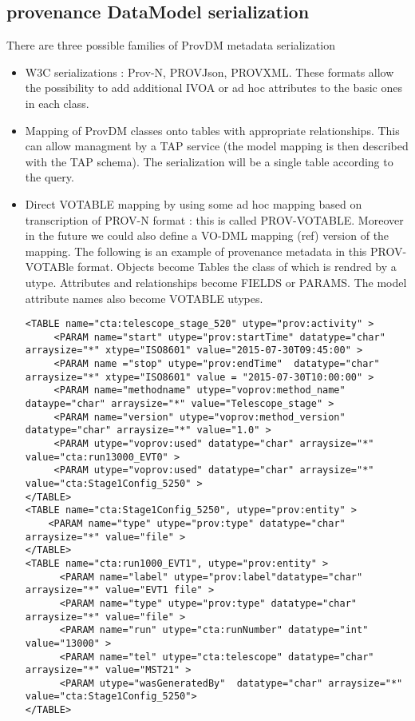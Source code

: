 

\subsection{provenance DataModel serialization}
There are three possible families of ProvDM metadata serialization
\begin{itemize}
 \item W3C serializations : Prov-N, PROV\-Json, PROV\-XML. These formats allow the possibility to add additional IVOA or ad hoc attributes to the basic ones in each class.
 \item Mapping of ProvDM classes onto tables with appropriate relationships. This can allow managment by a TAP service (the model mapping is then described with the TAP schema). The serialization will be a single table according to the query.

  \item Direct VOTABLE mapping by using   some ad hoc mapping based on transcription of PROV-N format : this is called PROV-VOTABLE. Moreover in the future we could also define a VO-DML mapping (ref) version of the mapping.
The following is an example of provenance metadata in this PROV-VOTABle format. Objects become Tables the class of which is rendred by a utype. Attributes and relationships become FIELDS or PARAMS. The model attribute names also become VOTABLE utypes.  
\begin{verbatim}
<TABLE name="cta:telescope_stage_520" utype="prov:activity" >
     <PARAM name="start" utype="prov:startTime" datatype="char" arraysize="*" xtype="ISO8601" value="2015-07-30T09:45:00" >
     <PARAM name ="stop" utype="prov:endTime"  datatype="char" arraysize="*" xtype="ISO8601" value = "2015-07-30T10:00:00" >
     <PARAM name="methodname" utype="voprov:method_name" dataype="char" arraysize="*" value="Telescope_stage" >
     <PARAM name="version" utype="voprov:method_version" datatype="char" arraysize="*" value="1.0" >    
     <PARAM utype="voprov:used" datatype="char" arraysize="*" value="cta:run13000_EVT0" >
     <PARAM utype="voprov:used" datatype="char" arraysize="*" value="cta:Stage1Config_5250" >    
</TABLE>
<TABLE name="cta:Stage1Config_5250", utype="prov:entity" >
    <PARAM name="type" utype="prov:type" datatype="char" arraysize="*" value="file" >   
</TABLE>
<TABLE name="cta:run1000_EVT1", utype="prov:entity" >
      <PARAM name="label" utype="prov:label"datatype="char" arraysize="*" value="EVT1 file" >
      <PARAM name="type" utype="prov:type" datatype="char" arraysize="*" value="file" >
      <PARAM name="run" utype="cta:runNumber" datatype="int"  value="13000" >
      <PARAM name="tel" utype="cta:telescope" datatype="char" arraysize="*" value="MST21" >
      <PARAM utype="wasGeneratedBy"  datatype="char" arraysize="*" value="cta:Stage1Config_5250">
</TABLE>
\end{verbatim}
  
  
\end{itemize}
